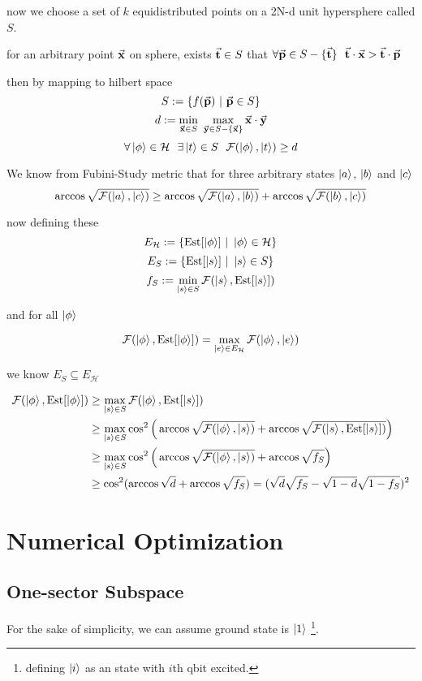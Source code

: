 \documentclass{article}
\DeclareMathOperator*{\est}{Est}
\begin{document}
now we choose a set of $k$ equidistributed points on a 2N-d unit hypersphere called $S$.

for an arbitrary point $\va{x}$ on sphere, exists $\va{t} \in S$ that $\forall \va{p} \in S - \{\va{t}\} ~~ \va{t}\cdot\va{x} > \va{t}\cdot \va{p}$

then by mapping to hilbert space
\[ S := \{ f(\va{p}) ~|~ \va{p} \in S \} \]
\[ d := \min_{\va{x} \in S} ~\max_{\va{y} \in S - \{\va{x}\}} \va{x}\cdot\va{y} \]
\[ \forall \ket{\phi} \in \mathcal{H} ~~ \exists \ket{t} \in S ~~ \mathcal{F}(\ket{\phi}, \ket{t}) \ge d \]

We know from Fubini-Study metric that for three arbitrary states $\ket{a}$, $\ket{b}$ and $\ket{c}$
\[ \arccos\sqrt{\mathcal{F}(\ket{a},\ket{c})} \ge \arccos\sqrt{\mathcal{F}(\ket{a},\ket{b})} + \arccos\sqrt{\mathcal{F}(\ket{b},\ket{c})}  \]

now defining these
\[ E_{\mathcal{H}} := \{\est[\ket{\phi}] ~|~ \ket{\phi} \in \mathcal{H} \} \]
\[ E_S := \{\est[\ket{s}] ~|~ \ket{s} \in S \} \]
\[ f_S := \min_{\ket{s} \in S} \mathcal{F}(\ket{s}, \est[\ket{s}]) \] 

and for all $\ket{\phi}$

\[ \mathcal{F}(\ket{\phi}, \est[\ket{\phi}]) = \max_{\ket{e} \in E_{\mathcal{H}}} \mathcal{F}(\ket{\phi}, \ket{e})\]

we know $E_S \subseteq E_{\mathcal{H}}$

\begin{align*} \mathcal{F}(\ket{\phi}, \est[\ket{\phi}]) &\ge \max_{\ket{s} \in S} \mathcal{F}(\ket{\phi}, \est[\ket{s}]) \\ &\ge \max_{\ket{s} \in S} \cos^2\Big( \arccos\sqrt{\mathcal{F} (\ket{\phi}, \ket{s})} + \arccos\sqrt{\mathcal{F}(\ket{s}, \est[\ket{s}])} \Big) 
\\ &\ge \max_{\ket{s} \in S} \cos^2\Big(\arccos\sqrt{\mathcal{F} (\ket{\phi}, \ket{s})} + \arccos{\sqrt{f_S}}\Big)  
\\ &\ge \cos^2(\arccos\sqrt{d} + \arccos\sqrt{f_S}) = (\sqrt{d}\sqrt{f_S} - \sqrt{1-d}\sqrt{1-f_S})^2
\end{align*}

\section{Numerical Optimization}
\subsection{One-sector Subspace}
For the sake of simplicity, we can assume ground state is $\ket{1}$%
\footnote{defining $\ket{i}$ as an state with $i$th qbit excited.}.
\end{document}
